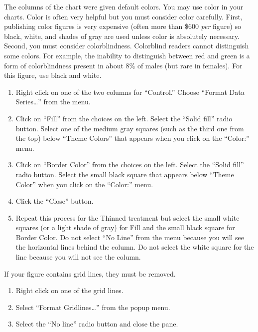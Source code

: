 \documentclass[12pt, hidelinks]{exam}
\begin{document}
The columns of the chart were given default colors. You may use color in your charts. Color is often very helpful but you must consider color carefully. First, publishing color figures is very expensive (often more than \$600 \emph{per} figure) so black, white, and shades of gray are used unless color is absolutely necessary. Second, you must consider colorblindness. Colorblind readers cannot distinguish some colors. For example, the inability to distinguish between red and green is a form of colorblindness present in about 8\% of males (but rare in females). For this figure, use black and white.

\begin{enumerate}[resume]
	\item Right click on one of the two columns for “Control.” Choose “Format Data Series\dots” from the menu.

	\item Click on “Fill” from the choices on the left. Select the “Solid fill” radio button. Select one of the medium gray squares (such as the third one from the top) below “Theme Colors” that appears when you click on the “Color:” menu.

	\item Click on “Border Color” from the choices on the left. Select the “Solid fill” radio button. Select the small black square that appears below “Theme Color” when you click on the “Color:” menu.

	\item Click the “Close” button.

	\item Repeat this process for the Thinned treatment but select the small white squares (or a light shade of gray) for Fill and the small black square for Border Color. Do not select “No Line” from the menu because you will see the horizontal lines behind the column. Do not select the white square for the line because you will not see the column.
\end{enumerate}

If your figure contains grid lines, they must be removed.

\begin{enumerate}[resume]
	\item Right click on one of the grid lines. 
	
	\item Select “Format Gridlines\dots” from the popup menu. 
	
	\item Select the “No line” radio button and close the pane.
\end{enumerate}
\end{document}
